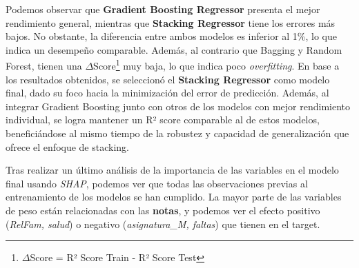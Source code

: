\documentclass{article}
\begin{document}


Podemos observar que \textbf{Gradient Boosting Regressor} presenta el mejor rendimiento general, mientras que \textbf{Stacking Regressor} tiene los errores más bajos. No obstante, la diferencia entre ambos modelos es inferior al 1\%, lo que indica un desempeño comparable.
Además, al contrario que Bagging y Random Forest, tienen una $\Delta$Score\footnote{$\Delta$Score = R² Score Train - R² Score Test} muy baja, lo que indica poco \textit{overfitting}. 
En base a los resultados obtenidos, se seleccionó el \textbf{Stacking Regressor} como modelo final, dado su foco hacia la minimización del error de predicción. Además, al integrar Gradient Boosting junto con otros de los modelos con mejor rendimiento individual, 
se logra mantener un R² score comparable al de estos modelos, beneficiándose al mismo tiempo de la robustez y capacidad de generalización que ofrece el enfoque de stacking.

Tras realizar un último análisis de la importancia de las variables en el modelo final usando \textit{SHAP}, podemos ver que todas las observaciones previas al entrenamiento de los modelos se han cumplido. La mayor parte de
las variables de peso están relacionadas con las \textbf{notas}, y podemos ver el efecto positivo (\textit{RelFam, salud}) o negativo (\textit{asignatura\_M, faltas}) que tienen en el target.
\end{document}
